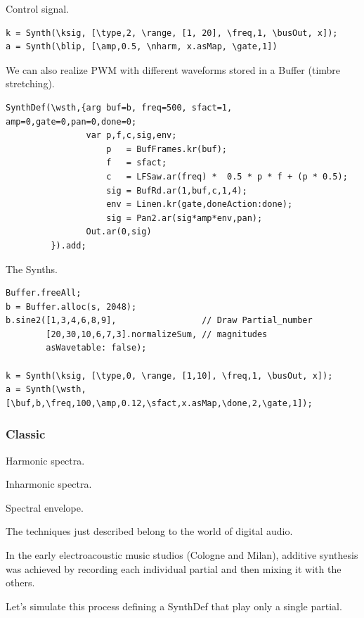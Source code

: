Control signal.

\begin{lstlisting}[frame=single] 
k = Synth(\ksig, [\type,2, \range, [1, 20], \freq,1, \busOut, x]);
a = Synth(\blip, [\amp,0.5, \nharm, x.asMap, \gate,1])
\end{lstlisting}

We can also realize PWM with different waveforms stored in a Buffer (timbre stretching).

\begin{lstlisting}[frame=single, caption=Timbre stretching model] 
SynthDef(\wsth,{arg buf=b, freq=500, sfact=1, amp=0,gate=0,pan=0,done=0;
                var p,f,c,sig,env;
                    p   = BufFrames.kr(buf);  
                    f   = sfact;
                    c   = LFSaw.ar(freq) *  0.5 * p * f + (p * 0.5);	               
                    sig = BufRd.ar(1,buf,c,1,4);
                    env = Linen.kr(gate,doneAction:done);
                    sig = Pan2.ar(sig*amp*env,pan);
                Out.ar(0,sig)
         }).add;
\end{lstlisting}

The Synths.

\begin{lstlisting}[frame=single] 
Buffer.freeAll;
b = Buffer.alloc(s, 2048);
b.sine2([1,3,4,6,8,9],                 // Draw Partial_number
        [20,30,10,6,7,3].normalizeSum, // magnitudes
        asWavetable: false); 
        
k = Synth(\ksig, [\type,0, \range, [1,10], \freq,1, \busOut, x]);
a = Synth(\wsth, [\buf,b,\freq,100,\amp,0.12,\sfact,x.asMap,\done,2,\gate,1]);
\end{lstlisting}

\subsubsection{Classic}\label{classic}

Harmonic spectra.

Inharmonic spectra.

Spectral envelope.

The techniques just described belong to the world of digital audio.

In the early electroacoustic music studios (Cologne and Milan), additive synthesis was achieved by recording each individual partial and then mixing it with the others.

Let's simulate this process defining a SynthDef that play only a single partial.

